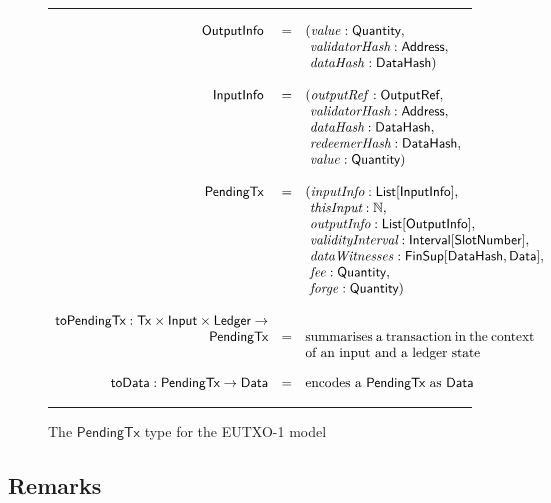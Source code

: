 \documentclass[a4paper]{article}
\renewcommand{\i}{\textit}  %
\newcommand{\s}{\textsf}  %
\newcommand{\msf}[1]{\ensuremath{\mathsf{#1}}}
\newcommand{\mi}[1]{\ensuremath{\mathit{#1}}}
\newcommand\rfskip{7pt}
\newenvironment{ruledfigure}[1]{\begin{figure}[#1]\hrule\vspace{\rfskip}}{\vspace{\rfskip}\hrule\end{figure}}
\newcommand{\List}[1]{\ensuremath{\s{List}[#1]}}
\newcommand{\Interval}[1]{\ensuremath{\s{Interval}[#1]}}
\newcommand{\FinSup}[2]{\ensuremath{\s{FinSup}[#1,#2]}}
\newcommand{\ptx}{\ensuremath{\s{PendingTx}}}
\newcommand{\toData}{\ensuremath{\s{toData}}}
\newcommand{\toPendingTx}{\ensuremath{\s{toPendingTx}}}
\newcommand{\Address}{\ensuremath{\s{Address}}}
\newcommand{\DataHash}{\ensuremath{\s{DataHash}}}
\newcommand{\forge}{\mi{forge}}
\newcommand{\fee}{\mi{fee}}
\newcommand{\val}{\mi{value}}  %
\newcommand{\dataHash}{\mi{dataHash}}
\newcommand{\dataWits}{\mi{dataWitnesses}}
\newcommand{\Data}{\ensuremath{\s{Data}}}
\newcommand{\outputref}{\mi{outputRef}}
\newcommand{\slotnum}{\ensuremath{\s{SlotNumber}}}
\newcommand{\eutxotx}{\msf{Tx}}
\newcommand{\qty}{\ensuremath{\s{Quantity}}}
\newcommand\N{\ensuremath{\mathbb{N}}}
\begin{document}
\begin{ruledfigure}{H}
  \begin{displaymath}
  \begin{array}{rll}
    \s{OutputInfo } &=&(\val: \qty,\\
                    & &\ \i{validatorHash}: \Address,\\
                    & &\ \dataHash: \DataHash)\\
    \\
    \s{InputInfo } &=&(\outputref: \s{OutputRef},\\
                   & &\ \i{validatorHash}: \Address,\\
                   & &\ \i{dataHash}: \DataHash,\\
                   & &\ \i{redeemerHash}: \DataHash,\\
                   & &\ \val: \qty)\\
     \\
     \ptx\s{ } &=&(\i{inputInfo}: \List{\s{InputInfo}},\\
               & &\ \i{thisInput}: \N,\\
               & &\ \i{outputInfo}: \List{\s{OutputInfo}},\\
               & &\ \i{validityInterval}: \Interval{\slotnum},\\
               & &\ \dataWits: \FinSup{\DataHash}{\Data},\\
               & &\ \fee: \qty,\\
               & &\ \forge: \qty)\\
     \\
     \toPendingTx: \eutxotx \times \s{Input} \times \s{Ledger} \rightarrow\\
      \ptx &=& \mbox{\parbox[t]{6cm}{summarises a transaction in the context of an input and a ledger state}}\\
      \\
     \toData: \ptx \rightarrow \Data &=& \mbox{encodes a \ptx{} as \Data}
  \end{array}
  \end{displaymath}
  \caption{The \ptx{} type for the EUTXO-1 model}
  \label{fig:ptx-1-types}
\end{ruledfigure}

\subsection{Remarks}
\end{document}

